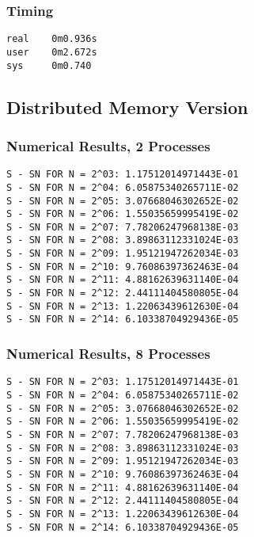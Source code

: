 \documentclass[a4paper, 12pt]{article}
\begin{document}
        \subsubsection{Timing} %
\begin{verbatim}
real    0m0.936s
user    0m2.672s
sys     0m0.740
\end{verbatim}        


    \subsection{Distributed Memory Version} %
        \subsubsection{Numerical Results, 2 Processes} %
        \begin{verbatim}
S - SN FOR N = 2^03: 1.17512014971443E-01
S - SN FOR N = 2^04: 6.05875340265711E-02
S - SN FOR N = 2^05: 3.07668046302652E-02
S - SN FOR N = 2^06: 1.55035659995419E-02
S - SN FOR N = 2^07: 7.78206247968138E-03
S - SN FOR N = 2^08: 3.89863112331024E-03
S - SN FOR N = 2^09: 1.95121947262034E-03
S - SN FOR N = 2^10: 9.76086397362463E-04
S - SN FOR N = 2^11: 4.88162639631140E-04
S - SN FOR N = 2^12: 2.44111404580805E-04
S - SN FOR N = 2^13: 1.22063439612630E-04
S - SN FOR N = 2^14: 6.10338704929436E-05
        \end{verbatim}

        \subsubsection{Numerical Results, 8 Processes} %
        \begin{verbatim}
S - SN FOR N = 2^03: 1.17512014971443E-01
S - SN FOR N = 2^04: 6.05875340265711E-02
S - SN FOR N = 2^05: 3.07668046302652E-02
S - SN FOR N = 2^06: 1.55035659995419E-02
S - SN FOR N = 2^07: 7.78206247968138E-03
S - SN FOR N = 2^08: 3.89863112331024E-03
S - SN FOR N = 2^09: 1.95121947262034E-03
S - SN FOR N = 2^10: 9.76086397362463E-04
S - SN FOR N = 2^11: 4.88162639631140E-04
S - SN FOR N = 2^12: 2.44111404580805E-04
S - SN FOR N = 2^13: 1.22063439612630E-04
S - SN FOR N = 2^14: 6.10338704929436E-05
        \end{verbatim}
\end{document}
